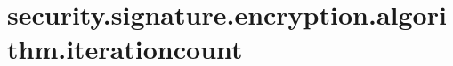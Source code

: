 \section{security.signature.encryption.algorithm.iterationcount}
\label{configuration:SecuritySignatureEncryptionAlgorithmIterationcount}
\TODO

